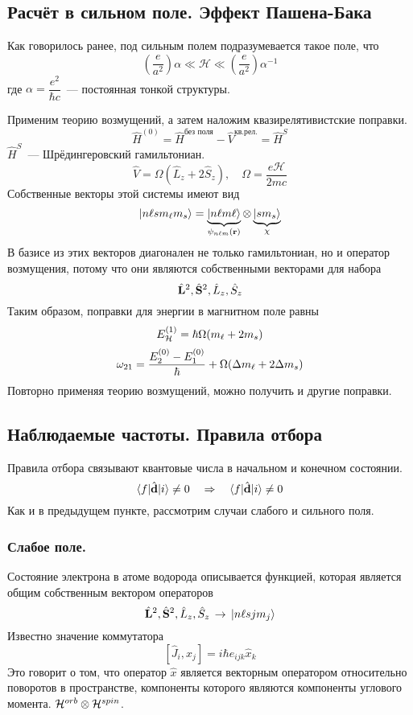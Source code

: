 \subsection{Расчёт в сильном поле. Эффект Пашена-Бака}
Как говорилось ранее, под сильным полем подразумевается такое поле, что
$$
    \left(
        \dfrac{e}{a^2}
    \right)\alpha \ll \mathcal H \ll \left(\dfrac{e}{a^2}\right) \alpha^{-1}
$$
где $\alpha = \dfrac{e^2}{\hbar c}$~--- постоянная тонкой структуры.

Применим теорию возмущений, а затем наложим квазирелятивистские поправки.
$$
    \hat H^{(0)} = \hat H^{\text{без поля}} - \hat V^{\text{кв.рел.}} = \hat H^{S}
$$
$\hat H^S$~--- Шрёдингеровский гамильтониан.
$$
    \hat V = \Omega (\hat L_z + 2 \hat S_z), \quad \Omega = \dfrac{e \mathcal H}{2mc}
$$
Собственные векторы этой системы имеют вид
$$
    \qu{n \l s m_\l m_s} = \underbrace{\qu{n \l m \l}}_{\psi_{n\l m}(\bf r)} \otimes \underbrace{\qu{s m_s}}_{\chi}
$$
В базисе из этих векторов диагонален не только гамильтониан, но и оператор возмущения, потому что они являются собственными векторами для набора
$$
    \hat{\bf L}^2, \hat{\bf S}^2, \hat L_z, \hat S_z
$$ 
Таким образом, поправки для энергии в магнитном поле равны
$$
    E_{\H}^{(1)} = \hbar \Omega (m_\l + 2 m_s)
$$
$$
    \omega_{21} = \dfrac{E_2^{(0)} - E_1^{(0)}}{\hbar} + \Omega (\Delta m_\l + 2 \Delta m_s)
$$
Повторно применяя теорию возмущений, можно получить и другие поправки.

\subsection{Наблюдаемые частоты. Правила отбора}
Правила отбора связывают квантовые числа в начальном и конечном состоянии.
$$
    \qtri{f}{\hat{\bf d}}{i} \neq 0 \RA \qtri{f}{\hat{\bf d}}{i} \neq 0
$$
Как и в предыдущем пункте, рассмотрим случаи слабого и сильного поля.

\subsubsection{Слабое поле.}

Состояние электрона в атоме водорода описывается функцией, которая является общим собственным вектором операторов
$$
    \hat{\bf L}^2, \hat{\bf S}^2, \hat L_z, \hat S_z \, \to \, \qu{n \l s j m_j}
$$
Известно значение коммутатора
$$
    [\hat J_i, \hat x_j] = i \hbar e_{ijk} \hat x_k
$$
Это говорит о том, что оператор $\hat x$ является векторным оператором относительно поворотов в пространстве, компоненты которого являются компоненты углового момента. $\H^{orb} \otimes \H^{spin}$.


